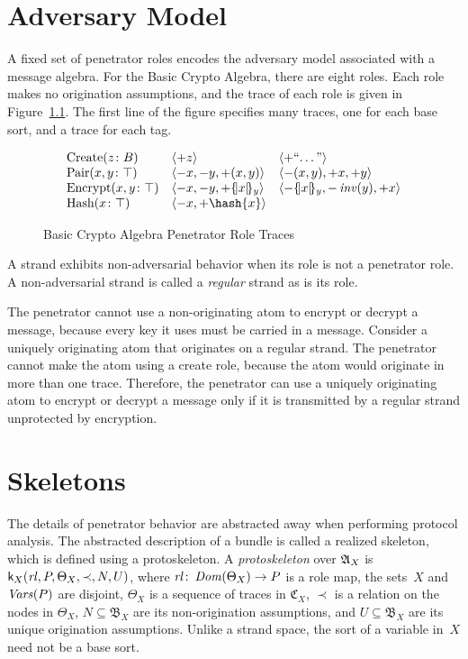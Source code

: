 \documentclass[12pt]{report}
\theoremstyle{definition}
\newcommand{\alga}{\alg{A}}
\newcommand{\tr}{\ensuremath{\mathfrak C}}
\newcommand{\base}{\ensuremath{\mathfrak B}}
\newcommand{\sdom}{\fn{Dom}}
\newcommand{\svars}{\fn{Vars}}
\newcommand{\skel}{\mathsf{k}}
\newcommand{\rl}{\fn{rl}}
\begin{document}
\chapter{Adversary Model}\label{chp:adversary model}

A fixed set of penetrator roles encodes the adversary model associated
with a message algebra.  For the Basic Crypto Algebra, there are eight
roles.  Each role makes no origination assumptions, and the trace of
each role is given in Figure~\ref{fig:pen}.  The first line of the
figure specifies many traces, one for each base sort, and a trace for
each tag.

\begin{figure}
$$\begin{array}{lll}
\mbox{Create}(z\colon B)&
\seq{\outbnd z}&\seq{\outbnd\mbox{``\ldots''}}\\
\mbox{Pair}(x,y\colon\top)&
\seq{\inbnd x,\inbnd y,\outbnd(x, y)}&
\seq{\inbnd(x, y),\outbnd x,\outbnd y}\\
\mbox{Encrypt}(x,y\colon\top)&
\seq{\inbnd x,\inbnd y,\outbnd\enc{x}{y}}&
\seq{\inbnd\enc{x}{y},\inbnd \fn{inv}(y),\outbnd x}\\
\mbox{Hash}(x\colon\top)&
\seq{\inbnd x,\outbnd\hash{x}}
\end{array}$$
\caption{Basic Crypto Algebra Penetrator Role Traces}\label{fig:pen}
\end{figure}

A strand exhibits non-adversarial behavior when its role is not a
penetrator role.  A non-adversarial strand is called a \emph{regular} strand as is its role.

The penetrator cannot use a non-originating atom to encrypt or decrypt
a message, because every key it uses must be carried in a message.
Consider a uniquely originating atom that originates on a regular
strand.  The penetrator cannot make the atom using a create role,
because the atom would originate in more than one trace.  Therefore,
the penetrator can use a uniquely originating atom to encrypt or
decrypt a message only if it is transmitted by a regular strand
unprotected by encryption.

\chapter{Skeletons}\label{chp:skeletons}

The details of penetrator behavior are abstracted away when performing
protocol analysis.  The abstracted description of a bundle is called a
realized skeleton, which is defined using a protoskeleton.  A
\emph{protoskeleton} over $\alga_X$ is
$\skel_X(\rl,P,\Theta_X,\prec,N,U)$, where $\rl\colon\sdom(\Theta_X)\to P$ is
a role map, the sets~$X$ and $\svars(P)$ are disjoint,
$\Theta_X$ is a sequence of traces in $\tr_X$, $\prec$ is a relation
on the nodes in $\Theta_X$, $N\subseteq\base_X$ are its
non-origination assumptions, and $U\subseteq\base_X$ are its unique
origination assumptions.  Unlike a strand space, the sort of a
variable in~$X$ need not be a base sort.
\end{document}

